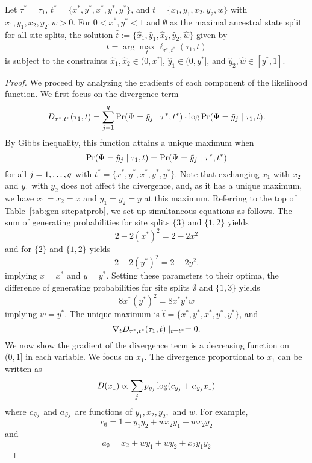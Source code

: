 \begin{lemma}
Let $\tau^*=\tau_1$, $t^*=\{x^*, y^*, x^*, y^*, y^*\}$, and $t=\{x_1, y_1, x_2, y_2, w\}$ with $x_1, y_1, x_2, y_2, w > 0$.
For $0 < x^*, y^* < 1$ and $\emptyset$ as the maximal ancestral state split for all site splits, the solution $\hat{t} := \{\hat{x}_1,\hat{y}_1,\hat{x}_2,\hat{y}_2,\hat{w}\}$ given by
\[
\hat{t} = \arg\max_t \ell_{\tau^*, t^*}(\tau_1, t)
\]
is subject to the constraints $\hat{x}_1,\hat{x}_2 \in (0, x^*]$, $\hat{y}_1 \in (0, y^*]$, and $\hat{y}_2,\hat{w} \in [y^*, 1]$.
\label{lemma:bounds}
\end{lemma}

\begin{proof}
We proceed by analyzing the gradients of each component of the likelihood function.
We first focus on the divergence term
\[
D_{\tau^*,t^*}(\tau_1,t) = \sum_{j=1}^q \Pr(\Psi=\tilde{y}_j \mid \tau^*, t^*) \cdot \log \Pr(\Psi=\tilde{y}_j \mid \tau_1, t).
\]
By Gibbs inequality, this function attains a unique maximum when
\[
\Pr(\Psi=\tilde{y}_j \mid \tau_1, t) = \Pr(\Psi=\tilde{y}_j \mid \tau^*, t^*)
\]
for all $j=1,\ldots,q$ with $t^*=\{x^*,y^*,x^*,y^*,y^*\}$.
Note that exchanging $x_1$ with $x_2$ and $y_1$ with $y_2$ does not affect the divergence, and, as it has a unique maximum, we have $x_1=x_2=x$ and $y_1=y_2=y$ at this maximum.
Referring to the top of Table~\ref{tab:gen-sitepatprob}, we set up simultaneous equations as follows.
The sum of generating probabilities for site splits $\{3\}$ and $\{1,2\}$ yields
\[
2-2(x^*)^2 = 2-2x^2
\]
and for $\{2\}$ and $\{1,2\}$ yields
\[
2-2(y^*)^2 = 2-2y^2.
\]
implying $x=x^*$ and $y=y^*$.
Setting these parameters to their optima, the difference of generating probabilities for site splits $\emptyset$ and $\{1,3\}$ yields
\[
8x^*(y^*)^2 = 8x^*y^*w
\]
implying $w=y^*$.
The unique maximum is $\hat{t}=\{x^*,y^*,x^*,y^*,y^*\}$, and
\[
\nabla_t D_{\tau^*,t^*}(\tau_1,t) \mid_{t=t^*} = 0.
\]
We now show the gradient of the divergence term is a decreasing function on $(0,1]$ in each variable.
We focus on $x_1$.
The divergence proportional to $x_1$ can be written as
\begin{align*}
D(x_1) \propto \sum_j p_{\tilde{y}_j} \log(c_{\tilde{y}_j} + a_{\tilde{y}_j}x_1)
\end{align*}
where $c_{\tilde{y}_j}$ and $a_{\tilde{y}_j}$ are functions of $y_1,x_2,y_2,$ and $w$.
For example,
\[
c_{\emptyset} = 1+y_1y_2+wx_2y_1+wx_2y_2
\]
and
\[
a_{\emptyset} = x_2+wy_1+wy_2+x_2y_1y_2
\]
\end{proof}
